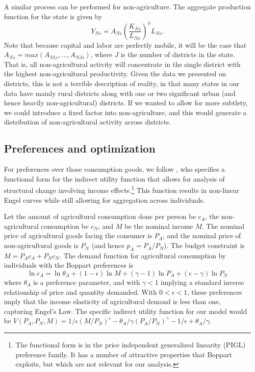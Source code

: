 \documentclass[11pt]{article}
\begin{document}
A similar process can be performed for non-agriculture. The aggregate production function for the state is given by
\begin{equation}
    Y_{Ns} = A_{Ns} \left(\frac{K_{Ns}}{L_{Ns}}\right)^{\phi} L_{Ns}. \label{EQ_YN}
\end{equation}
Note that because capital and labor are perfectly mobile, it will be the case that $A_{Ns} = max(A_{N1s},...,A_{NJs})$, where $J$ is the number of districts in the state. That is, all non-agricultural activity will concentrate in the single district with the highest non-agricultural productivity. Given the data we presented on districts, this is not a terrible description of reality, in that many states in our data have mainly rural districts along with one or two significant urban (and hence heavily non-agricultural) districts. If we wanted to allow for more subtlety, we could introduce a fixed factor into non-agriculture, and this would generate a distribution of non-agricultural activity across districts.

\subsection{Preferences and optimization}
For preferences over those consumption goods, we follow \cite{boppart2014}, who specifies a functional form for the indirect utility function that allows for analysis of structural change involving income effects.\footnote{The functional form is in the price independent generalized linearity (PIGL) preference family. It has a number of attractive properties that Boppart exploits, but which are not relevant for our analysis.} This function results in non-linear Engel curves while still allowing for aggregation across individuals. 

Let the amount of agricultural consumption done per person be $c_A$, the non-agricultural consumption be $c_N$, and $M$ be the nominal income $M$. The nominal price of agricultural goods facing the consumer is $P_A$, and the nominal price of non-agricultural goods is $P_N$ (and hence $p_A = P_A/P_N$). The budget constraint is $M = P_A c_A + P_N c_N$. The demand function for agricultural consumption by individuals with the Boppart preferences is
\begin{equation}
    \ln c_A = \ln \theta_A + (1-\epsilon) \ln M + (\gamma - 1) \ln P_A + (\epsilon - \gamma) \ln P_N \label{EQ_ca_demand}
\end{equation}
where $\theta_A$ is a preference parameter, and with $\gamma<1$ implying a standard inverse relationship of price and quantity demanded. With $0 < \epsilon < 1$, these preferences imply that the income elasticity of agricultural demand is less than one, capturing Engel's Law. The specific indirect utility function for our model would be $V(P_A,P_N,M) = 1/\epsilon \left(M/P_N\right)^{\epsilon} - \theta_A/\gamma \left(P_A/P_N\right)^{\gamma} - 1/\epsilon + \theta_A/\gamma$.
\end{document}
